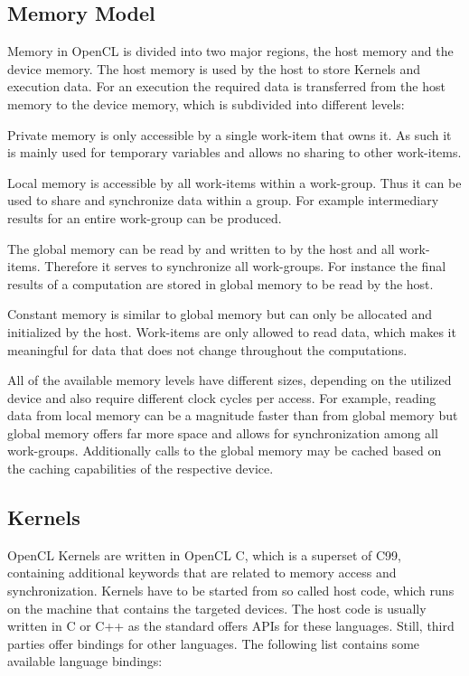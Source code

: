 \subsection*{Memory Model}

Memory in OpenCL is divided into two major regions, the host memory and the device memory. The host memory is used by the host to store Kernels and execution data. For an execution the required data is transferred from the host memory to the device memory, which is subdivided into different levels:

\begin{description}[align=left,leftmargin=0cm]
  \item [Private] Private memory is only accessible by a single work-item that owns it. As such it is mainly used for temporary variables and allows no sharing to other work-items.
  \item [Local] Local memory is accessible by all work-items within a work-group. Thus it can be used to share and synchronize data within a group. For example intermediary results for an entire work-group can be produced.
  \item [Global] The global memory can be read by and written to by the host and all work-items. Therefore it serves to synchronize all work-groups. For instance the final results of a computation are stored in global memory to be read by the host.
  \item [Constant] Constant memory is similar to global memory but can only be allocated and initialized by the host. Work-items are only allowed to read data, which makes it meaningful for data that does not change throughout the computations.
\end{description}

All of the available memory levels have different sizes, depending on the utilized device and also require different clock cycles per access. For example, reading data from local memory can be a magnitude faster than from global memory but global memory offers far more space and allows for synchronization among all work-groups. Additionally calls to the global memory may be cached based on the caching capabilities of the respective device.

\subsection*{Kernels}

OpenCL Kernels are written in OpenCL C, which is a superset of C99, containing additional keywords that are related to memory access and synchronization. Kernels have to be started from so called host code, which runs on the machine that contains the targeted devices. The host code is usually written in C or C++ as the standard offers APIs for these languages. Still, third parties offer bindings for other languages. The following list contains some available language bindings:

